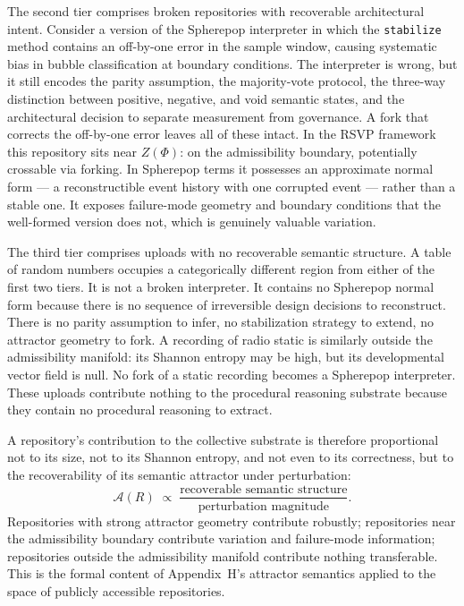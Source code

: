 \documentclass[12pt]{article}
\begin{document}
The second tier comprises broken repositories with recoverable architectural
intent. Consider a version of the Spherepop interpreter in which the
\texttt{stabilize} method contains an off-by-one error in the sample window,
causing systematic bias in bubble classification at boundary conditions. The
interpreter is wrong, but it still encodes the parity assumption, the
majority-vote protocol, the three-way distinction between positive, negative,
and void semantic states, and the architectural decision to separate measurement
from governance. A fork that corrects the off-by-one error leaves all of these
intact. In the RSVP framework this repository sits near $Z(\Phi)$: on the
admissibility boundary, potentially crossable via forking. In Spherepop terms
it possesses an approximate normal form --- a reconstructible event history with
one corrupted event --- rather than a stable one. It exposes failure-mode
geometry and boundary conditions that the well-formed version does not, which
is genuinely valuable variation.

The third tier comprises uploads with no recoverable semantic structure. A table
of random numbers occupies a categorically different region from either of the
first two tiers. It is not a broken interpreter. It contains no Spherepop normal
form because there is no sequence of irreversible design decisions to reconstruct.
There is no parity assumption to infer, no stabilization strategy to extend, no
attractor geometry to fork. A recording of radio static is similarly outside
the admissibility manifold: its Shannon entropy may be high, but its
developmental vector field is null. No fork of a static recording becomes a
Spherepop interpreter. These uploads contribute nothing to the procedural
reasoning substrate because they contain no procedural reasoning to extract.

A repository's contribution to the collective substrate is therefore proportional
not to its size, not to its Shannon entropy, and not even to its correctness,
but to the recoverability of its semantic attractor under perturbation:
\[
\mathcal{A}(R)
\;\propto\;
\frac{\text{recoverable semantic structure}}{\text{perturbation magnitude}}.
\]
Repositories with strong attractor geometry contribute robustly; repositories
near the admissibility boundary contribute variation and failure-mode
information; repositories outside the admissibility manifold contribute nothing
transferable. This is the formal content of Appendix~H's attractor semantics
applied to the space of publicly accessible repositories.
\end{document}

